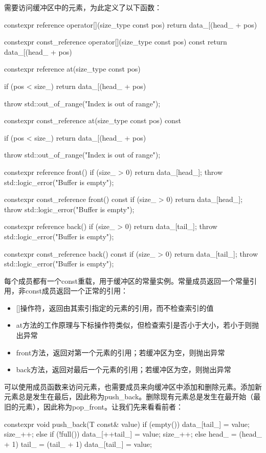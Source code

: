 需要访问缓冲区中的元素，为此定义了以下函数：

\begin{cpp}
constexpr reference operator[](size_type const pos)
{
	return data_[(head_ + pos) %
}

constexpr const_reference operator[](size_type const pos) const
{
	return data_[(head_ + pos) %
}

constexpr reference at(size_type const pos)
{
	if (pos < size_)
		return data_[(head_ + pos) %
		
	throw std::out_of_range("Index is out of range");
}

constexpr const_reference at(size_type const pos) const
{
	if (pos < size_)
		return data_[(head_ + pos) %
		
	throw std::out_of_range("Index is out of range");
}

constexpr reference front()
{
	if (size_ > 0) return data_[head_];
	throw std::logic_error("Buffer is empty");
}

constexpr const_reference front() const
{
	if (size_ > 0) return data_[head_];
	throw std::logic_error("Buffer is empty");
}

constexpr reference back()
{
	if (size_ > 0) return data_[tail_];
	throw std::logic_error("Buffer is empty");
}

constexpr const_reference back() const
{
	if (size_ > 0) return data_[tail_];
	throw std::logic_error("Buffer is empty");
}
\end{cpp}

每个成员都有一个const重载，用于缓冲区的常量实例。常量成员返回一个常量引用，非const成员返回一个正常的引用：

\begin{itemize}
  \item {}[]操作符，返回由其索引指定的元素的引用，而不检查索引的值
  \item at方法的工作原理与下标操作符类似，但检查索引是否小于大小，若小于则抛出异常
  \item front方法，返回对第一个元素的引用；若缓冲区为空，则抛出异常
  \item back方法，返回对最后一个元素的引用；若缓冲区为空，则抛出异常
\end{itemize}

可以使用成员函数来访问元素，也需要成员来向缓冲区中添加和删除元素。添加新元素总是发生在最后，因此称为push\_back。删除现有元素总是发生在最开始（最旧的元素），因此称为pop\_front。让我们先来看看前者：

\begin{cpp}
constexpr void push_back(T const& value)
{
	if (empty())
	{
		data_[tail_] = value;
		size_++;
	}
	else if (!full())
	{
		data_[++tail_] = value;
		size_++;
	}
	else
	{
		head_ = (head_ + 1) %
		tail_ = (tail_ + 1) %
		data_[tail_] = value;
	}
}
\end{cpp}

